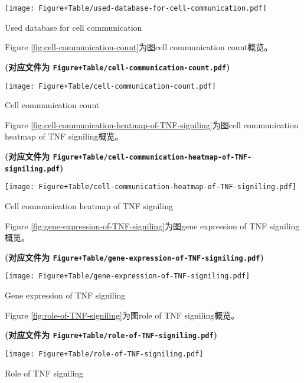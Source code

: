 \documentclass[
]{article}
\begin{document}
\def\@captype{figure}
\begin{center}
\texttt{[image: Figure+Table/used-database-for-cell-communication.pdf]}
\caption{Used database for cell communication}\label{fig:used-database-for-cell-communication}
\end{center}

Figure \ref{fig:cell-communication-count}为图cell communication count概览。

\textbf{(对应文件为 \texttt{Figure+Table/cell-communication-count.pdf})}

\def\@captype{figure}
\begin{center}
\texttt{[image: Figure+Table/cell-communication-count.pdf]}
\caption{Cell communication count}\label{fig:cell-communication-count}
\end{center}

Figure \ref{fig:cell-communication-heatmap-of-TNF-signiling}为图cell communication heatmap of TNF signiling概览。

\textbf{(对应文件为 \texttt{Figure+Table/cell-communication-heatmap-of-TNF-signiling.pdf})}

\def\@captype{figure}
\begin{center}
\texttt{[image: Figure+Table/cell-communication-heatmap-of-TNF-signiling.pdf]}
\caption{Cell communication heatmap of TNF signiling}\label{fig:cell-communication-heatmap-of-TNF-signiling}
\end{center}

Figure \ref{fig:gene-expression-of-TNF-signiling}为图gene expression of TNF signiling概览。

\textbf{(对应文件为 \texttt{Figure+Table/gene-expression-of-TNF-signiling.pdf})}

\def\@captype{figure}
\begin{center}
\texttt{[image: Figure+Table/gene-expression-of-TNF-signiling.pdf]}
\caption{Gene expression of TNF signiling}\label{fig:gene-expression-of-TNF-signiling}
\end{center}

Figure \ref{fig:role-of-TNF-signiling}为图role of TNF signiling概览。

\textbf{(对应文件为 \texttt{Figure+Table/role-of-TNF-signiling.pdf})}

\def\@captype{figure}
\begin{center}
\texttt{[image: Figure+Table/role-of-TNF-signiling.pdf]}
\caption{Role of TNF signiling}\label{fig:role-of-TNF-signiling}
\end{center}
\end{document}
